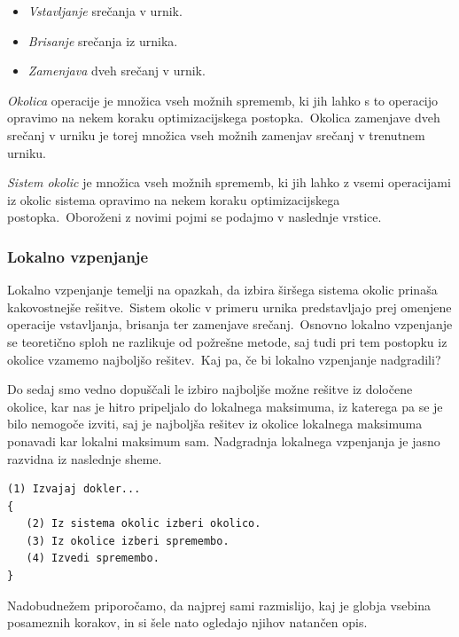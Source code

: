 \documentclass[a4paper,10pt]{article}
\begin{document}
\begin{itemize}
  \item \emph{Vstavljanje} srečanja v urnik.
 \item  \emph{Brisanje} srečanja iz urnika.
 \item  \emph{Zamenjava} dveh srečanj v urnik.
\end{itemize}

\noindent \emph{Okolica} operacije je množica vseh možnih sprememb, ki jih lahko s to operacijo
opravimo na nekem koraku optimizacijskega postopka.\ Okolica zamenjave dveh srečanj v urniku
je torej množica vseh možnih zamenjav srečanj v trenutnem urniku.

\emph{Sistem okolic} je množica vseh možnih sprememb, ki jih lahko z vsemi operacijami iz
okolic sistema opravimo na nekem koraku optimizacijskega postopka.\ Oboroženi z novimi pojmi
se podajmo v naslednje vrstice.

\subsubsection{Lokalno vzpenjanje}

Lokalno vzpenjanje temelji na opazkah, da izbira širšega sistema okolic prinaša kakovostnejše
rešitve.\ Sistem okolic v primeru urnika predstavljajo prej omenjene operacije vstavljanja,
brisanja ter zamenjave srečanj.\ Osnovno lokalno vzpenjanje se teoretično sploh ne razlikuje
od požrešne metode, saj tudi pri tem postopku iz okolice vzamemo najboljšo rešitev.\ Kaj pa,
če bi lokalno vzpenjanje nadgradili?

Do sedaj smo vedno dopuščali le izbiro najboljše možne rešitve iz določene okolice, kar nas
je hitro pripeljalo do lokalnega maksimuma, iz katerega pa se je bilo nemogoče izviti, saj
je najboljša rešitev iz okolice lokalnega maksimuma ponavadi kar lokalni maksimum sam.
Nadgradnja lokalnega vzpenjanja je jasno razvidna iz naslednje sheme.

\begin{verbatim}
(1) Izvajaj dokler...
{
   (2) Iz sistema okolic izberi okolico.
   (3) Iz okolice izberi spremembo.
   (4) Izvedi spremembo.
}
\end{verbatim}

\noindent Nadobudnežem priporočamo, da najprej sami razmislijo, kaj je globja vsebina posameznih
korakov, in si šele nato ogledajo njihov natančen opis.
\end{document}
